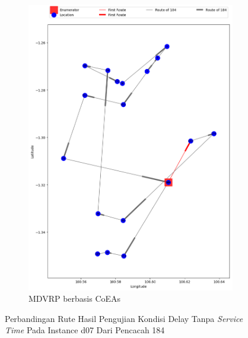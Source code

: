 \begin{figure}[H]
	\centering
	\begin{subfigure}[t]{\textwidth}
		\centering
		\includegraphics[width=\textwidth]{Resources/Images/delayed_7/real_m15_n100_delayed_7_184_coes}
		\caption{MDVRP berbasis CoEAs}
		\label{fig:real_m15_n100_delayed_7_184_coes}
	\end{subfigure}
	\caption{Perbandingan Rute Hasil Pengujian Kondisi Delay Tanpa \textit{Service Time} Pada Instance d07 Dari Pencacah 184}
	\label{fig:real_m15_n100_delayed_7_184}
\end{figure}


